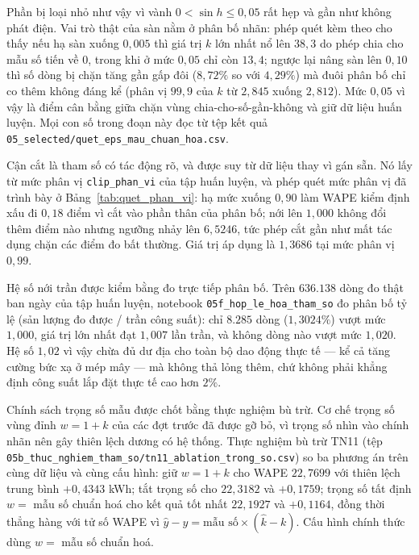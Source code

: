 \documentclass[12pt, a4paper]{report}
\begin{document}
Phần bị loại nhỏ như vậy vì vành $0 < \sin h \le 0{,}05$ rất hẹp và gần như không phát điện.
Vai trò thật của sàn nằm ở phân bố nhãn: phép quét kèm theo cho thấy nếu hạ sàn xuống
$0{,}005$ thì giá trị $k$ lớn nhất nổ lên $38{,}3$ do phép chia cho mẫu số tiến về $0$, trong
khi ở mức $0{,}05$ chỉ còn $13{,}4$; ngược lại nâng sàn lên $0{,}10$ thì số dòng bị chặn tăng
gần gấp đôi ($8{,}72\%$ so với $4{,}29\%$) mà đuôi phân bố chỉ co thêm không đáng kể (phân vị
$99{,}9$ của $k$ từ $2{,}845$ xuống $2{,}812$). Mức $0{,}05$ vì vậy là điểm cân bằng giữa chặn
vùng chia-cho-số-gần-không và giữ dữ liệu huấn luyện. Mọi con số trong đoạn này đọc từ tệp kết
quả \texttt{05\_selected/\allowbreak quet\_eps\_mau\_chuan\_hoa.csv}.

Cận cắt là tham số có tác động rõ, và được suy từ dữ liệu thay vì gán sẵn. Nó lấy từ
mức phân vị \texttt{clip\_phan\_vi} của tập huấn luyện, và phép quét mức phân vị đã trình bày ở
Bảng~\ref{tab:quet_phan_vi}: hạ mức xuống $0{,}90$ làm WAPE kiểm định xấu đi $0{,}18$ điểm vì
cắt vào phần thân của phân bố; nới lên $1{,}000$ không đổi thêm điểm nào nhưng ngưỡng nhảy lên
$6{,}5246$, tức phép cắt gần như mất tác dụng chặn các điểm đo bất thường. Giá trị áp dụng
là $1{,}3686$ tại mức phân vị $0{,}99$.

Hệ số nới trần được kiểm bằng đo trực tiếp phân bố. Trên $636.138$ dòng đo thật ban
ngày của tập huấn luyện, notebook \texttt{05f\_hop\_le\_hoa\_tham\_so} đo phân bố tỷ lệ (sản
lượng đo được / trần công suất): chỉ $8.285$ dòng ($1{,}3024\%$) vượt mức $1{,}000$, giá trị
lớn nhất đạt $1{,}007$ lần trần, và không dòng nào vượt mức $1{,}020$. Hệ số $1{,}02$ vì vậy
chừa đủ dư địa cho toàn bộ dao động thực tế --- kể cả tăng cường bức xạ ở mép mây --- mà không
thả lỏng thêm, chứ không phải khẳng định công suất lắp đặt thực tế cao hơn $2\%$.

Chính sách trọng số mẫu được chốt bằng thực nghiệm bù trừ. Cơ chế trọng số vùng đỉnh
$w = 1 + k$ của các đợt trước đã được gỡ bỏ, vì trọng số nhìn vào chính nhãn nên gây thiên
lệch dương có hệ thống. Thực nghiệm bù trừ TN11 (tệp
\texttt{05b\_thuc\_nghiem\_tham\_so/\allowbreak tn11\_ablation\_trong\_so.csv}) so ba phương án trên cùng
dữ liệu và cùng cấu hình: giữ $w = 1 + k$ cho WAPE $22{,}7699$ với thiên lệch trung bình
$+0{,}4343$ kWh; tắt trọng số cho $22{,}3182$ và $+0{,}1759$; trọng số tất định $w =$ mẫu số
chuẩn hoá cho kết quả tốt nhất $22{,}1927$ và $+0{,}1164$, đồng thời thẳng hàng với tử số
WAPE vì $\hat{y} - y = \text{mẫu số} \times (\hat{k} - k)$. Cấu hình chính thức dùng
$w =$ mẫu số chuẩn hoá.
\end{document}
